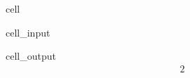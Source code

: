 \documentclass[letterpaper,10pt,english]{jupyterBook}
\begin{document}
\begin{sphinxuseclass}{cell}\begin{sphinxVerbatimInput}

\begin{sphinxuseclass}{cell_input}
\begin{sphinxVerbatim}[commandchars=\\\{\}]
\end{sphinxVerbatim}

\end{sphinxuseclass}\end{sphinxVerbatimInput}
\begin{sphinxVerbatimOutput}

\begin{sphinxuseclass}{cell_output}\begin{equation*}
\begin{split}2\end{split}
\end{equation*}
\end{sphinxuseclass}\end{sphinxVerbatimOutput}

\end{sphinxuseclass}
\end{document}
